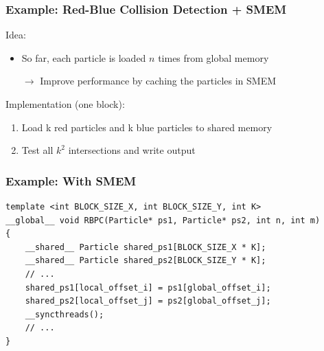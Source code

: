 \documentclass[aspectratio=169,handout]{beamer}
\begin{document}
\begin{frame}[fragile]
\frametitle{Example: Red-Blue Collision Detection + SMEM}
Idea:
\begin{itemize}
	\item So far, each particle is loaded $n$ times from global memory
	\item[$\rightarrow$] Improve performance by caching the particles in SMEM
\end{itemize}
Implementation (one block):
\begin{enumerate}
	\item Load k red particles and k blue particles to shared memory
	\item Test all $k^2$ intersections and write output
\end{enumerate}
\end{frame}



\begin{frame}[fragile]
\frametitle{Example: With SMEM}
\begin{lstlisting}
template <int BLOCK_SIZE_X, int BLOCK_SIZE_Y, int K>
__global__ void RBPC(Particle* ps1, Particle* ps2, int n, int m)
{
    __shared__ Particle shared_ps1[BLOCK_SIZE_X * K];
    __shared__ Particle shared_ps2[BLOCK_SIZE_Y * K];
    // ...
    shared_ps1[local_offset_i] = ps1[global_offset_i];
    shared_ps2[local_offset_j] = ps2[global_offset_j];
    __syncthreads();
    // ...
}
\end{lstlisting}
\end{frame}


\end{document}

